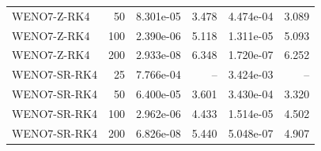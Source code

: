 \begin{table}[H]
\begin{tabular}{lrrrrr}
WENO7-Z-RK4 & 50 & 8.301e-05 & 3.478 & 4.474e-04 & 3.089 \\
WENO7-Z-RK4 & 100 & 2.390e-06 & 5.118 & 1.311e-05 & 5.093 \\
WENO7-Z-RK4 & 200 & 2.933e-08 & 6.348 & 1.720e-07 & 6.252 \\
\midrule
WENO7-SR-RK4 & 25 & 7.766e-04 & -- & 3.424e-03 & -- \\
WENO7-SR-RK4 & 50 & 6.400e-05 & 3.601 & 3.430e-04 & 3.320 \\
WENO7-SR-RK4 & 100 & 2.962e-06 & 4.433 & 1.514e-05 & 4.502 \\
WENO7-SR-RK4 & 200 & 6.826e-08 & 5.440 & 5.048e-07 & 4.907 \\
\bottomrule
\end{tabular}
\end{table}
